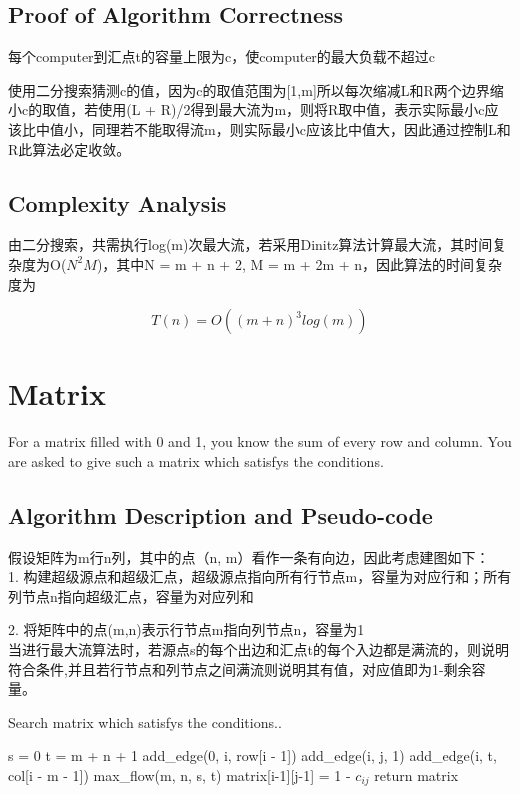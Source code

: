 \documentclass{article}
\begin{document}
\subsection{Proof of Algorithm Correctness}
每个computer到汇点t的容量上限为c，使computer的最大负载不超过c

使用二分搜索猜测c的值，因为c的取值范围为[1,m]所以每次缩减L和R两个边界缩小c的取值，若使用(L + R)/2得到最大流为m，则将R取中值，表示实际最小c应该比中值小，同理若不能取得流m，则实际最小c应该比中值大，因此通过控制L和R此算法必定收敛。

\subsection{Complexity Analysis}
由二分搜索，共需执行log(m)次最大流，若采用Dinitz算法计算最大流，其时间复杂度为O($N^2M$)，其中N = m + n + 2, M = m + 2m + n，因此算法的时间复杂度为

\begin{equation}
T(n) = O((m + n)^3log(m))
\end{equation}

\newpage
\section{Matrix}
For a matrix filled with 0 and 1, you know the sum of every row and column. You are asked to give such a matrix which satisfys the conditions.


\subsection{Algorithm Description and Pseudo-code}
假设矩阵为m行n列，其中的点（n, m）看作一条有向边，因此考虑建图如下：\\

1. 构建超级源点和超级汇点，超级源点指向所有行节点m，容量为对应行和；所有列节点n指向超级汇点，容量为对应列和

2. 将矩阵中的点(m,n)表示行节点m指向列节点n，容量为1\\

当进行最大流算法时，若源点s的每个出边和汇点t的每个入边都是满流的，则说明符合条件,并且若行节点和列节点之间满流则说明其有值，对应值即为1-剩余容量。

\begin{algorithm}[htbp]  
  \caption{Search matrix which satisfys the conditions..}  
  \begin{algorithmic}[1] 
	\State s = 0
	\State t = m + n + 1
	\State add\_edge(0, i, row[i - 1])
	\State add\_edge(i, j, 1)
	\EndFor
	\EndFor
	\State add\_edge(i, t, col[i - m - 1])
	\EndFor
	\State max\_flow(m, n, s, t)
	\State matrix[i-1][j-1] = 1 - $c_{ij}$
	\EndFor
	\EndFor
	\State return matrix
    \EndFunction 
  \end{algorithmic}  
\end{algorithm} 
\end{document}
